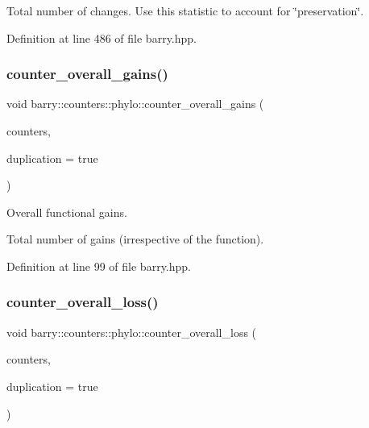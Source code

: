 Total number of changes. Use this statistic to account for \char`\"{}preservation\char`\"{}. 



Definition at line 486 of file barry.\+hpp.

\mbox{\label{namespacebarry_1_1counters_1_1phylo_ae1e599324d656660ce8730b77efcbcce}} 
\subsubsection{\texorpdfstring{counter\+\_\+overall\+\_\+gains()}{counter\_overall\_gains()}}
{\footnotesize\ttfamily void barry\+::counters\+::phylo\+::counter\+\_\+overall\+\_\+gains (\begin{DoxyParamCaption}\item[{\hyperlink{namespacebarry_1_1counters_1_1phylo_a4e401ffe66d04091343dcffaf915f8c3}{Phylo\+Counters} $\ast$}]{counters,  }\item[{bool}]{duplication = {\ttfamily true} }\end{DoxyParamCaption})\hspace{0.3cm}{\ttfamily [inline]}}



Overall functional gains. 

Total number of gains (irrespective of the function). 

Definition at line 99 of file barry.\+hpp.

\mbox{\label{namespacebarry_1_1counters_1_1phylo_a79ccde09af0d3d47b1a3162a16bc4597}} 
\subsubsection{\texorpdfstring{counter\+\_\+overall\+\_\+loss()}{counter\_overall\_loss()}}
{\footnotesize\ttfamily void barry\+::counters\+::phylo\+::counter\+\_\+overall\+\_\+loss (\begin{DoxyParamCaption}\item[{\hyperlink{namespacebarry_1_1counters_1_1phylo_a4e401ffe66d04091343dcffaf915f8c3}{Phylo\+Counters} $\ast$}]{counters,  }\item[{bool}]{duplication = {\ttfamily true} }\end{DoxyParamCaption})\hspace{0.3cm}{\ttfamily [inline]}}



